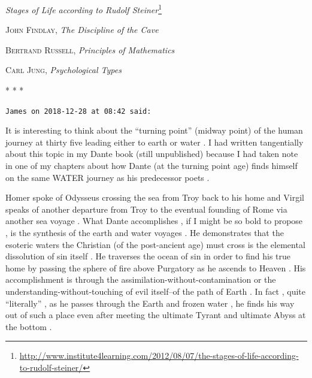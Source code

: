 \textit{Stages of Life according to Rudolf Steiner}\footnote{\url{http://www.institute4learning.com/2012/08/07/the-stages-of-life-according-to-rudolf-steiner/}}

\textsc{John Findlay}, \emph{The Discipline of the Cave}

\textsc{Bertrand Russell}, \emph{Principles of Mathematics}

\textsc{Carl Jung}, \emph{Psychological Types}




\begin{center}* * *\end{center}

\begin{footnotesize}
\begin{sffamily}
\texttt{James on 2018-12-28 at 08:42 said:}

It is interesting to think about the ``turning point'' (midway point) of the human journey at thirty five leading either to earth or water . I had written tangentially about this topic in my Dante book (still unpublished) because I had taken note in one of my chapters about how Dante (at the turning point age) finds himself on the same WATER journey as his predecessor poets .

Homer spoke of Odysseus crossing the sea from Troy back to his home and Virgil speaks of another departure from Troy to the eventual founding of Rome via another sea voyage . What Dante accomplishes , if I might be so bold to propose , is the synthesis of the earth and water voyages . He demonstrates that the esoteric waters the Christian (of the post-ancient age) must cross is the elemental dissolution of sin itself . He traverses the ocean of sin in order to find his true home by passing the sphere of fire above Purgatory as he ascends to Heaven . His accomplishment is through the assimilation-without-contamination or the understanding-without-touching of evil itself--of the path of Earth . In fact , quite ``literally'' , as he passes through the Earth and frozen water , he finds his way out of such a place even after meeting the ultimate Tyrant and ultimate Abyss at the bottom .


\end{sffamily}
\end{footnotesize}
